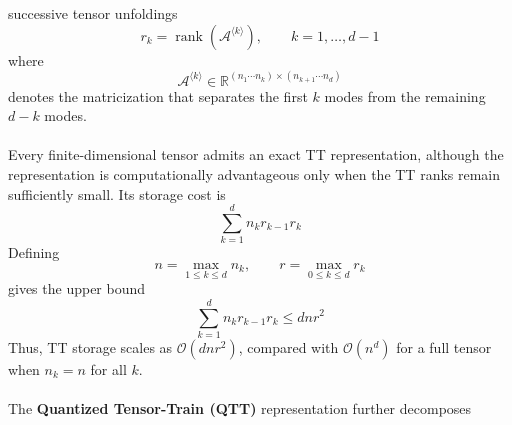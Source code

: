 \documentclass{article}
\numberwithin{equation}{subsection}
\theoremstyle{definition}
\theoremstyle{remark}
\begin{document}
successive tensor unfoldings
\begin{equation}
r_k
=
\operatorname{rank}
\left(
\mathcal{A}^{\langle k\rangle}
\right),
\qquad
k=1,\ldots,d-1
\label{eq:tt-unfolding-rank}
\end{equation}
where
\begin{equation}
\mathcal{A}^{\langle k\rangle}
\in
\mathbb{R}^{(n_1\cdots n_k)\times(n_{k+1}\cdots n_d)}
\end{equation}
denotes the matricization that separates the first \(k\) modes from the
remaining \(d-k\) modes.\\
\\
Every finite-dimensional tensor admits an exact TT representation, although
the representation is computationally advantageous only when the TT ranks
remain sufficiently small. Its storage cost is
\begin{equation}
\sum_{k=1}^{d} n_k r_{k-1}r_k
\label{eq:tt-storage}
\end{equation}
Defining
\begin{equation}
n=\max_{1\leq k\leq d}n_k,
\qquad
r=\max_{0\leq k\leq d}r_k
\end{equation}
gives the upper bound
\begin{equation}
\sum_{k=1}^{d} n_k r_{k-1}r_k
\leq dnr^2
\end{equation}
Thus, TT storage scales as
\(\mathcal{O}(dnr^2)\), compared with
\(\mathcal{O}(n^d)\) for a full tensor when \(n_k=n\) for all \(k\).
\\
\\
The \textbf{Quantized Tensor-Train (QTT)} representation further decomposes
\end{document}

